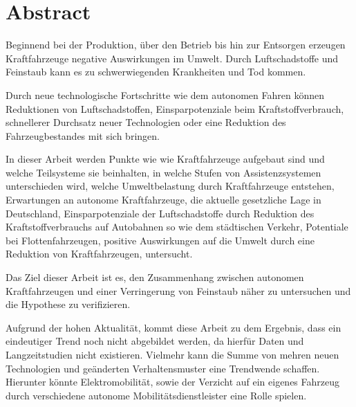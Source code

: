 \chapter*{Abstract}
Beginnend bei der Produktion, über den Betrieb bis hin zur Entsorgen erzeugen Kraftfahrzeuge
negative Auswirkungen im Umwelt.
Durch Luftschadstoffe und Feinstaub kann es zu schwerwiegenden Krankheiten und Tod kommen.


Durch neue technologische Fortschritte wie dem autonomen Fahren können
Reduktionen von Luftschadstoffen,
Einsparpotenziale beim Kraftstoffverbrauch,
schnellerer Durchsatz neuer Technologien
oder eine Reduktion des Fahrzeugbestandes mit sich bringen.


In dieser Arbeit werden Punkte wie
wie Kraftfahrzeuge aufgebaut sind und welche Teilsysteme sie beinhalten,
in welche Stufen von Assistenzsystemen unterschieden wird,
welche Umweltbelastung durch Kraftfahrzeuge entstehen,
Erwartungen an autonome Kraftfahrzeuge,
die aktuelle gesetzliche Lage in Deutschland,
Einsparpotenziale der Luftschadstoffe durch Reduktion des Kraftstoffverbrauchs auf Autobahnen so wie dem städtischen Verkehr,
Potentiale bei Flottenfahrzeugen,
positive Auswirkungen auf die Umwelt durch eine Reduktion von Kraftfahrzeugen,
untersucht.


Das Ziel dieser Arbeit ist es, den Zusammenhang zwischen
autonomen Kraftfahrzeugen und einer Verringerung von Feinstaub näher zu untersuchen und
die Hypothese zu verifizieren.

Aufgrund der hohen Aktualität, kommt diese Arbeit zu dem Ergebnis,
dass ein eindeutiger Trend noch nicht abgebildet werden,
da hierfür Daten und Langzeitstudien nicht existieren.
Vielmehr kann die Summe von mehren neuen Technologien und geänderten Verhaltensmuster eine Trendwende schaffen.
Hierunter könnte Elektromobilität, sowie der Verzicht auf ein eigenes Fahrzeug durch verschiedene
autonome Mobilitätsdienstleister eine Rolle spielen.